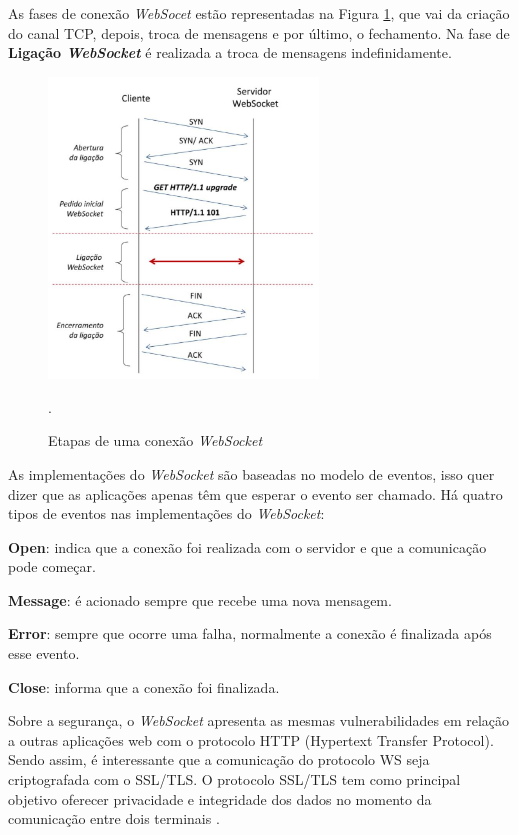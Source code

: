 \documentclass[
	12pt,				%
	oneside,			%
	a4paper,			%
	english,			%
	brazil				%
	]{abntex2ppgsi}
\begin{document}
As fases de conexão \textit{WebSocet} estão representadas na Figura \ref{fig:etapas_ws}, que vai da criação do canal TCP, depois, troca de mensagens e por último, o fechamento. Na fase de \textbf{Ligação \textit{WebSocket}} é realizada a troca de mensagens indefinidamente.

\begin{figure}[h!]
	\centering
	\includegraphics[height=8cm]{images/etapas_ws.png}
	\caption{Etapas de uma conexão \textit{WebSocket} \cite{themudo2014implementaccao}}.
	\label{fig:etapas_ws}
\end{figure}

As implementações do \textit{WebSocket} são baseadas no modelo de eventos, isso quer dizer que as aplicações apenas têm que esperar o evento ser chamado. Há quatro tipos de eventos nas implementações do \textit{WebSocket}:
 
\begin{itemize*}
	\item{\textbf{Open}: indica que a conexão foi realizada com o servidor e que a comunicação pode começar.}
	\item{\textbf{Message}: é acionado sempre que recebe uma nova mensagem.}
	\item{\textbf{Error}: sempre que ocorre uma falha, normalmente a conexão é finalizada após esse evento.}
	\item{\textbf{Close}: informa que a conexão foi finalizada.}
\end{itemize*}

Sobre a segurança, o \textit{WebSocket} apresenta as mesmas vulnerabilidades em relação a outras aplicações web com o protocolo HTTP (Hypertext Transfer Protocol). Sendo assim, é interessante que a comunicação do protocolo WS seja criptografada com o SSL/TLS.  O protocolo SSL/TLS tem como principal objetivo oferecer privacidade e integridade dos dados no momento da comunicação entre dois terminais \cite{themudo2014implementaccao}. %
\end{document}

